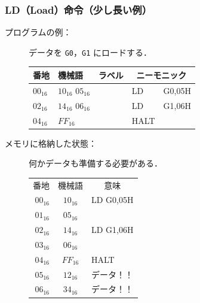 \documentclass[handout]{beamer}        %
\begin{document}
\begin{frame}
  \frametitle{LD（Load）命令（少し長い例）}
  \begin{description}
  \item[プログラムの例：] データを \texttt{G0}，\texttt{G1} にロードする．\\
    {\ttfamily\small\begin{center}
      \begin{tabular}{|l|l|l|l l|} \hline
        番地 & 機械語 & ラベル & \multicolumn{2}{|c|}{ニーモニック} \\
        \hline
        $00_{16}$ & $10_{16}$ $05_{16}$ & & LD   & G0,05H \\
        $02_{16}$ & $14_{16}$ $06_{16}$ & & LD   & G1,06H \\
        $04_{16}$ & $FF_{16}$           & & HALT &       \\
        \hline
      \end{tabular}
    \end{center}}
    \vfill

    \item[メモリに格納した状態：] 何かデータも準備する必要がある．
      {\ttfamily\small\begin{center}
        \begin{tabular}{r|c|l}
          \multicolumn{1}{c}{番地} &
          \multicolumn{1}{c}{機械語} &
          \multicolumn{1}{c}{意味} \\
          \cline{2-2}
          $00_{16}$ & $10_{16}$ & LD G0,05H \\
          \cline{2-2}
          $01_{16}$ & $05_{16}$ &           \\
          \cline{2-2}
          $02_{16}$ & $14_{16}$ & LD G1,06H \\
          \cline{2-2}
          $03_{16}$ & $06_{16}$ &           \\
          \cline{2-2}
          $04_{16}$ & $FF_{16}$ & HALT      \\
          \cline{2-2}
          $05_{16}$ & $12_{16}$ & データ！！\\
          \cline{2-2}
          $06_{16}$ & $34_{16}$ & データ！！\\
          \cline{2-2}
        \end{tabular}
      \end{center}}
      \vfill

  \end{description}
\end{frame}
\end{document}

